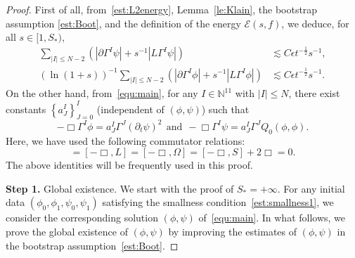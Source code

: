 \documentclass[a4paper,reqno]{amsart}
\theoremstyle{definition}
\numberwithin{equation}{section}
\begin{document}
\begin{proof}
    First of all, from~\eqref{est:L2energy}, Lemma~\ref{le:Klain}, the bootstrap assumption \eqref{est:Boot}, and the definition of the energy $\mathcal{E}(s,f)$,  we deduce, for all $s\in [1,S_{*})$, 
\begin{equation}\label{est:Bootpoint}
    \begin{aligned}
       \sum_{|I|\le N-2}
       \left(\left|\partial \Gamma^{I}\psi\right|+s^{-1}\left|L\Gamma^{I}\psi\right|\right)
      & \lesssim C\epsilon t^{-\frac{1}{2}}s^{-1},\\
      (\ln(1+s))^{-1}
      \sum_{|I|\le N-2}
       \left(\left|\partial \Gamma^{I}\phi\right|+s^{-1}\left|L\Gamma^{I}\phi\right|\right)
      & \lesssim C\epsilon t^{-\frac{1}{2}}s^{-1}.
       \end{aligned}
    \end{equation}
    On the other hand, from~\eqref{equ:main}, for any $I\in \mathbb{N}^{11}$ with $|I|\le N$, there exist constants $\left\{a_{J}^{I}\right\}_{J=0}^{I}$  (independent of $(\phi,\psi)$) such that
\begin{equation*}
-\Box{\Gamma}^{I}\phi=a_{J}^{I}{\Gamma}^{J}\left(\partial_{t}\psi\right)^{2} \ \ \mbox{and} \ \
-\Box {\Gamma}^{I}\psi={ a}_{J}^{I}{\Gamma}^{J}Q_{0}(\phi,\phi).
\end{equation*}
Here, we have used the following commutator relations: 
\begin{equation*}
[-\Box, \partial]=[-\Box, L]=[-\Box, \Omega]=[-\Box,S]+2\Box=0.
\end{equation*}
The above identities will be frequently used in this proof. 

\smallskip
{\bf Step 1.} Global existence. We start with the proof of $S_{*}=+\infty$. 
For any initial data $(\phi_{0},\phi_1,{\psi}_{0},\psi_1)$ satisfying the smallness condition~\eqref{est:smallness1}, we consider the corresponding solution $(\phi,\psi)$ of~\eqref{equ:main}. In what follows, we prove the global existence of $(\phi,\psi)$ by improving the estimates of $(\phi,\psi)$ in the bootstrap assumption~\eqref{est:Boot}.


\end{proof}
\end{document}
